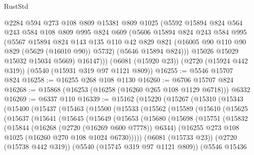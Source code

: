 \begin{lexlean}{RustStd}
\begin{coremodule}
          @2284
          @594
          @273
          @108
          @809
          @15381
          @809
          @1025
          (@5592
            @15894
            @824
            @564
            @243
            @584
            @108
            @809
            @995
            @824
            @609
            (@5606
              @15894
              @824
              @243
              @584
              @995
              (@5567
                @15894
                @824
                @143
                @135
                @110
                @42
                @829
                @821
                (@16005 @90 @110 @90 @829 (@5629 (@16010 @90)) @5732)
                (@5646 @15894 @824)))
            @15026
            @15029
            @15032
            @15034
            @5669)
          @16147)))
    (@6081 (@15920 @23))
    (@2720 (@15924 @442 @319))
    (@5540 (@15931 @319 @97 @1121 @809))
@16255 := @5546 @15707 @824
@16258 := @16255 @268 @108 @1130
@16260 := @6706 @15707 @824
@16268 := @15868 (@16253 (@16258 (@16260 @265 @108 @1129 @6718))) @6332
@16269 := @6337 @110
@16339 := @15162
    (@15220
      (@15267
        (@15310
          (@15343
            (@15400
              (@15437
                (@15463
                  (@15500
                    (@15533
                      (@15562
                        (@15589
                          (@15610
                            (@15625
                              (@15637
                                (@15641
                                  (@15645
                                    (@15649
                                      (@15653
                                        (@15680
                                          (@15698
                                            (@15751
                                              (@15832
                                                (@15844
                                                  (@16268 (@2720 (@16269 @600 @7778)) @6344)
                                                  (@16255
                                                    @273
                                                    @108
                                                    @1025
                                                    (@16260 @270 @108 @1024 @6730)))))
                                            (@6081 (@15733 @23))
                                            (@2720 (@15738 @442 @319))
                                            (@5540 (@15745 @319 @97 @1121 @809))
                                            (@5546
                                              @15436

\end{coremodule}
\end{lexlean}
